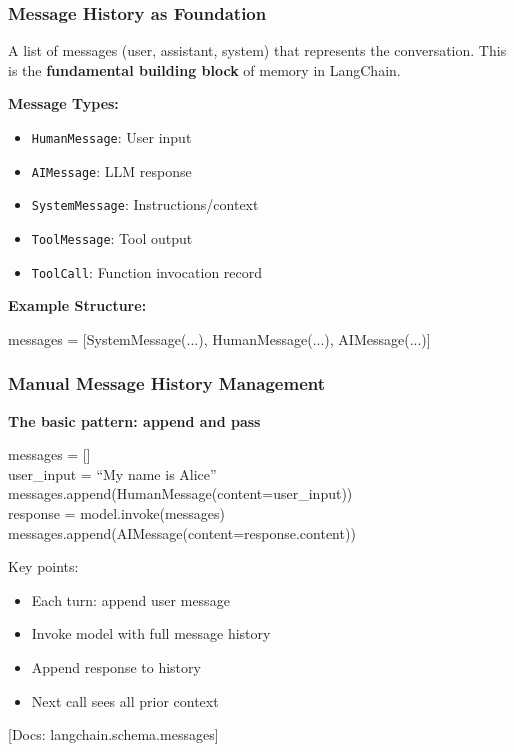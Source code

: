 \documentclass[aspectratio=169,11pt]{beamer}
\newcommand{\docref}[1]{{\scriptsize\color{docgray}[Docs: #1]}}
\begin{document}
\begin{frame}
  \frametitle{Message History as Foundation}
  \begin{conceptbox}
    A list of messages (user, assistant, system) that represents the conversation.
    This is the \textbf{fundamental building block} of memory in LangChain.
  \end{conceptbox}
  \vspace{0.6em}
  \textbf{Message Types:}
  \begin{itemize}
    \item \texttt{HumanMessage}: User input
    \item \texttt{AIMessage}: LLM response
    \item \texttt{SystemMessage}: Instructions/context
    \item \texttt{ToolMessage}: Tool output
    \item \texttt{ToolCall}: Function invocation record
  \end{itemize}
  \vspace{0.6em}
  \textbf{Example Structure:}
  \begin{codebox}
    \ttfamily\small
    messages = [SystemMessage(...), HumanMessage(...), AIMessage(...)]
  \end{codebox}
\end{frame}

\begin{frame}
  \frametitle{Manual Message History Management}
  \textbf{The basic pattern: append and pass}
  \vspace{0.6em}
  \begin{codebox}
    \ttfamily\small
    messages = [] \\
    user\_input = ``My name is Alice'' \\
    messages.append(HumanMessage(content=user\_input)) \\
    response = model.invoke(messages) \\
    messages.append(AIMessage(content=response.content))
  \end{codebox}
  \vspace{0.6em}
  Key points:
  \begin{itemize}
    \item Each turn: append user message
    \item Invoke model with full message history
    \item Append response to history
    \item Next call sees all prior context
  \end{itemize}
  \docref{langchain.schema.messages}
\end{frame}
\end{document}
